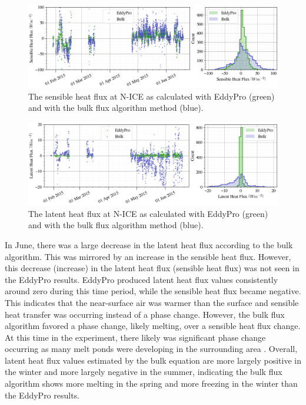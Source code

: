 \begin{figure}[t!]
    \centering
    \includegraphics[width=1\linewidth]{figures/chapter5/BulkSensible.png}
    \caption[Sensible heat flux from a bulk flux method compared to EddyPro.]{The sensible heat flux at N-ICE as calculated with EddyPro (green) and with the bulk flux algorithm method (blue).}
    \label{fig:bulk:sensible}
\end{figure}
\begin{figure}[t!]
    \centering
    \includegraphics[width=1\linewidth]{figures/chapter5/BulkLatent.png}
    \caption[Latent heat flux from a bulk flux method compared to EddyPro.]{The latent heat flux at N-ICE as calculated with EddyPro (green) and with the bulk flux algorithm method (blue).}
    \label{fig:bulk:latent}
\end{figure}

In June, there was a large decrease in the latent heat flux according to the bulk algorithm. This was mirrored by an increase in the sensible heat flux. However, this decrease (increase) in the latent heat flux (sensible heat flux) was not seen in the EddyPro results. EddyPro produced latent heat flux values consistently around zero during this time period, while the sensible heat flux became negative. This indicates that the near-surface air was warmer than the surface and sensible heat transfer was occurring instead of a phase change. However, the bulk flux algorithm favored a phase change, likely melting, over a sensible heat flux change. At this time in the experiment, there likely was significant phase change occurring as many melt ponds were developing in the surrounding area \citep{walden:2017}. Overall, latent heat flux values estimated by the bulk equation are more largely positive in the winter and more largely negative in the summer, indicating the bulk flux algorithm shows more melting in the spring and more freezing in the winter than the EddyPro results. 

